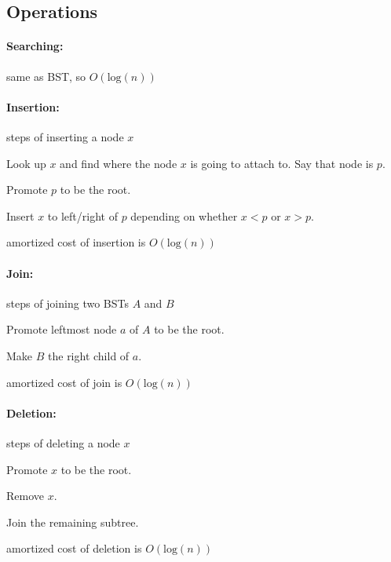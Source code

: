 \documentclass[12pt]{article}
\begin{document}
\subsection{Operations}

\paragraph{Searching:} same as BST, so $O(\text{log}(n))$

\paragraph{Insertion:} steps of inserting a node $x$
\begin{steps}[leftmargin=3cm]
 \item Look up $x$ and find where the node $x$ is going to attach to. Say that node is $p$.
 \item Promote $p$ to be the root.
 \item Insert $x$ to left/right of $p$ depending on whether $x < p$ or $x > p$.
\end{steps}
amortized cost of insertion is $O(\text{log}(n))$

\paragraph{Join:} steps of joining two BSTs $A$ and $B$
\begin{steps}[leftmargin=3cm]
 \item Promote leftmost node $a$ of $A$ to be the root.
 \item Make $B$ the right child of $a$.
\end{steps}
amortized cost of join is $O(\text{log}(n))$

\paragraph{Deletion:} steps of deleting a node $x$
\begin{steps}[leftmargin=3cm]
 \item Promote $x$ to be the root.
 \item Remove $x$.
 \item Join the remaining subtree.
\end{steps}
amortized cost of deletion is $O(\text{log}(n))$
\end{document}
